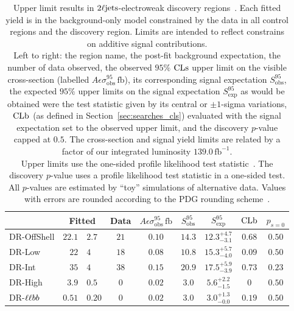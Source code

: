\begin{table}[tp]
\centering
\begin{tabular*}{\textwidth}{l|r@{$~\pm~$}lcccccc}
& \multicolumn{2}{c}{Fitted}
& Data
& $A\epsilon\sigma_{\mathrm{obs}}^{95}\,\mathrm{fb}$
& $S_{\mathrm{obs}}^{95}$
& $S_{\mathrm{exp}}^{95}$
& $\mathrm{CLb}$
& $p_{s\!=\!0}$
\\
\hline
DR-OffShell & $22.1$ & $2.7$ & $21$ & $0.10$ & $14.3$ & $12.3^{+4.7}_{-3.1}$ & $0.68$ & $0.50$
\\[.5ex]
DR-Low & $22$ & $4$ & $18$ & $0.08$ & $10.8$ & $15.3^{+5.7}_{-4.0}$ & $0.09$ & $0.50$
\\[.5ex]
DR-Int & $35$ & $4$ & $38$ & $0.15$ & $20.9$ & $17.5^{+5.9}_{-3.9}$ & $0.73$ & $0.23$
\\[.5ex]
DR-High & $3.9$ & $0.5$ & $0$ & $0.02$ & $3.0$ & $5.6^{+2.2}_{-1.5}$ & $0$ & $0.50$
\\[.5ex]
DR-$\ell\ell bb$ & $0.51$ & $0.20$ & $0$ & $0.02$ & $3.0$ & $3.0^{+1.3}_{-0.0}$ & $0.19$ & $0.50$
\\[.5ex]
\end{tabular*}
\caption[
Upper limit results in $\twoljets$-electroweak discovery regions
]{%
Upper limit results in $\twoljets$-electroweak discovery
regions~\cite{atlas2022searches}.
Each fitted yield is in the background-only model constrained by the data in
all control regions and the discovery region.
Limits are intended to reflect constrains on additive signal contributions.
\\[0.5em]
Left to right:
the region name,
the post-fit background expectation,
the number of data observed,
the observed $95\%$ $\mathrm{CLs}$ upper limit on the visible cross-section
(labelled $A\epsilon\sigma_{\mathrm{obs}}^{95}\,\mathrm{fb}$\footnotemark),
its corresponding signal expectation $S_\mathrm{obs}^{95}$,
the expected $95\%$ upper limits on the signal expectation $S_\mathrm{exp}^{95}$
as would be obtained were the test statistic given by its central or
$\pm1$-sigma variations,
$\mathrm{CLb}$ (as defined in Section~\ref{sec:searches_cls}) evaluated with the signal
expectation set to the observed upper limit,
and the discovery $p$-value capped at $0.5$.
The cross-section and signal yield limits are related by a factor of our
integrated luminosity $139.0\,\mathrm{fb}^{-1}$.
\\[0.5em]
Upper limits use the one-sided profile likelihood test
statistic~\cite{Cowan:2010js}.
The discovery $p$-value uses a profile likelihood test statistic in a one-sided
test.
All $p$-values are estimated by ``toy'' simulations of alternative data.
Values with errors are rounded according to the PDG rounding
scheme~\cite{pdg2022ynf}.%
}
\label{tab:2ljets_discovery}
\end{table}


